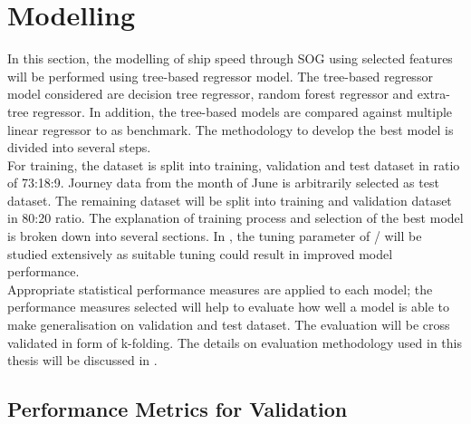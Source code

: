 \section{Modelling}\label{sec:modelling}

In this section, the modelling of ship speed through SOG using selected features will be performed using tree-based regressor model. The tree-based regressor model considered are decision tree regressor, random forest regressor and extra-tree regressor. In addition, the tree-based models are compared against multiple linear regressor to as benchmark. The methodology to develop the best model is divided into several steps.\\

For training, the dataset is split into training, validation and test dataset in ratio of 73:18:9. Journey data from the month of June is arbitrarily selected as test dataset. The remaining dataset will be split into training and validation dataset in 80:20 ratio. The explanation of training process and selection of the best model is broken down into several sections. In , the tuning parameter of \scikit/ will be studied extensively as suitable tuning could result in improved model performance.\\

Appropriate statistical performance measures are applied to each model; the performance measures selected will help to evaluate how well a model is able to make generalisation on validation and test dataset. The evaluation will be cross validated in form of k-folding. The details on evaluation methodology used in this thesis will be discussed in . \\

\subsection{Performance Metrics for Validation}\label{sec:perf_metrics}

